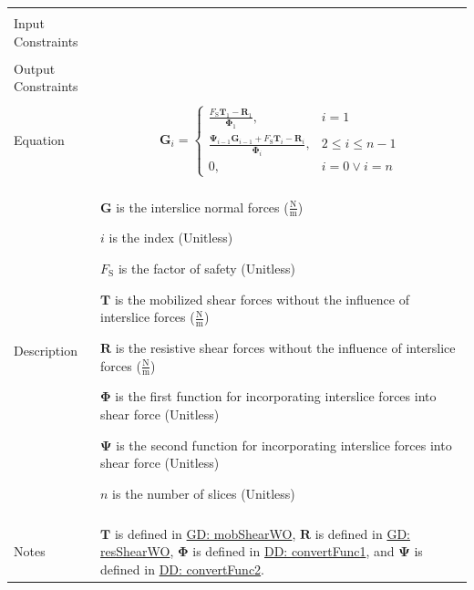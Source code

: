 \documentclass[12pt]{article}
\begin{document}
\begin{minipage}{\textwidth}
\begin{tabular}{>{\raggedright}p{}>{\raggedright\arraybackslash}p{}}
\\ \midrule \\
Input Constraints & 
\\ \midrule \\
Output Constraints & 
\\ \midrule \\
Equation & \begin{displaymath}
           {\mathbf{G}}_{i}=\begin{cases}
                            \frac{{F_{\text{S}}} {\mathbf{T}}_{1}-{\mathbf{R}}_{1}}{{\mathbf{Φ}}_{1}}, & i=1\\
                            \frac{{\mathbf{Ψ}}_{i-1} {\mathbf{G}}_{i-1}+{F_{\text{S}}} {\mathbf{T}}_{i}-{\mathbf{R}}_{i}}{{\mathbf{Φ}}_{i}}, & 2\leq{}i\leq{}n-1\\
                            0, & i=0\lor{}i=n
                            \end{cases}
           \end{displaymath}
\\ \midrule \\
Description & \begin{symbDescription}
              \item{$\mathbf{G}$ is the interslice normal forces ($\frac{\text{N}}{\text{m}}$)}
              \item{$i$ is the index (Unitless)}
              \item{${F_{\text{S}}}$ is the factor of safety (Unitless)}
              \item{$\mathbf{T}$ is the mobilized shear forces without the influence of interslice forces ($\frac{\text{N}}{\text{m}}$)}
              \item{$\mathbf{R}$ is the resistive shear forces without the influence of interslice forces ($\frac{\text{N}}{\text{m}}$)}
              \item{$\mathbf{Φ}$ is the first function for incorporating interslice forces into shear force (Unitless)}
              \item{$\mathbf{Ψ}$ is the second function for incorporating interslice forces into shear force (Unitless)}
              \item{$n$ is the number of slices (Unitless)}
              \end{symbDescription}
\\ \midrule \\
Notes & $\mathbf{T}$ is defined in \hyperref[GD:mobShearWO]{GD: mobShearWO}, $\mathbf{R}$ is defined in \hyperref[GD:resShearWO]{GD: resShearWO}, $\mathbf{Φ}$ is defined in \hyperref[DD:convertFunc1]{DD: convertFunc1}, and $\mathbf{Ψ}$ is defined in \hyperref[DD:convertFunc2]{DD: convertFunc2}.
        

\end{tabular}
\end{minipage}
\end{document}
